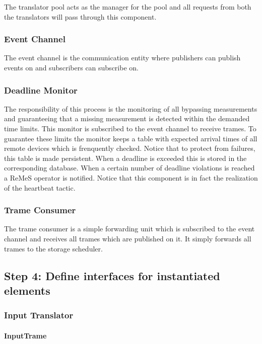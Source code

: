\npar The translator pool acts as the manager for the pool and all requests from
both the translators will pass through this component. 

\subsubsection{Event Channel}

\npar The event channel is the communication entity where publishers can publish
events on and subscribers can subscribe on.

\subsubsection{Deadline Monitor}

\npar The responsibility of this process is the monitoring of all bypassing
measurements and guaranteeing that a missing measurement is detected within the
demanded time limits. This monitor is subscribed to the event channel to receive
trames. To guarantee these limits the monitor keeps a table with expected
arrival times of all remote devices which is frenquently checked. Notice that to
protect from failures, this table is made persistent. When a deadline is
exceeded this is stored in the corresponding database. When a certain number of
deadline violations is reached a ReMeS operator is notified. Notice that this
component is in fact the realization of the heartbeat tactic. 

\subsubsection{Trame Consumer}

\npar The trame consumer is a simple forwarding unit which is subscribed to the
event channel and receives all trames which are published on it. It simply
forwards all trames to the storage scheduler.

\subsection{Step 4: Define interfaces for instantiated elements}
\label{add:it2/interfaces}

\subsubsection{Input Translator}

\paragraph{InputTrame}


